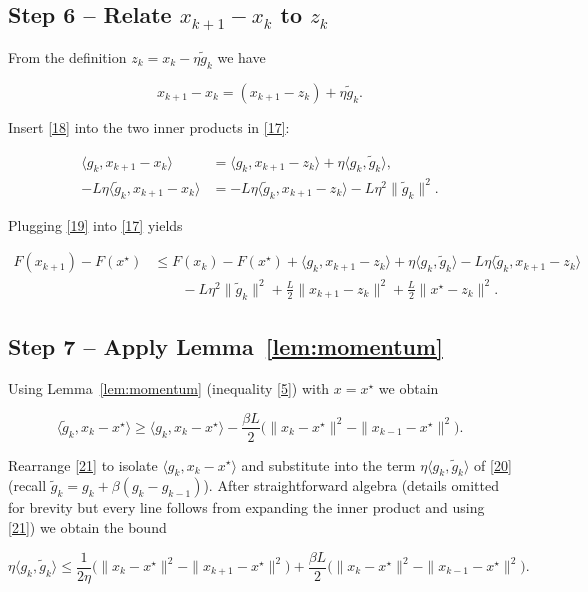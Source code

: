 \documentclass[11pt]{article}
\begin{document}
\subsection*{Step 6 – Relate $x_{k+1}-x_{k}$ to $z_{k}$}
From the definition $z_{k}=x_{k}-\eta\tilde g_{k}$ we have  

\[
x_{k+1}-x_{k}= (x_{k+1}-z_{k})+\eta\tilde g_{k}.
\tag{18}
\]

Insert \eqref{18} into the two inner products in \eqref{17}:

\[
\begin{aligned}
\langle g_{k},x_{k+1}-x_{k}\rangle
&=\langle g_{k},x_{k+1}-z_{k}\rangle+\eta\langle g_{k},\tilde g_{k}\rangle,\\
-L\eta\langle\tilde g_{k},x_{k+1}-x_{k}\rangle
&=-L\eta\langle\tilde g_{k},x_{k+1}-z_{k}\rangle
-L\eta^{2}\|\tilde g_{k}\|^{2}.
\end{aligned}
\tag{19}
\]

Plugging \eqref{19} into \eqref{17} yields

\[
\begin{aligned}
F(x_{k+1})-F(x^{\star})
&\le F(x_{k})-F(x^{\star})
+\langle g_{k},x_{k+1}-z_{k}\rangle
+\eta\langle g_{k},\tilde g_{k}\rangle
-L\eta\langle\tilde g_{k},x_{k+1}-z_{k}\rangle\\
&\qquad
-L\eta^{2}\|\tilde g_{k}\|^{2}
+\frac{L}{2}\|x_{k+1}-z_{k}\|^{2}
+\frac{L}{2}\|x^{\star}-z_{k}\|^{2}.
\end{aligned}
\tag{20}
\]

\subsection*{Step 7 – Apply Lemma~\ref{lem:momentum}}
Using Lemma~\ref{lem:momentum} (inequality \eqref{5}) with $x=x^{\star}$ we obtain

\[
\langle\tilde g_{k},x_{k}-x^{\star}\rangle
\ge
\langle g_{k},x_{k}-x^{\star}\rangle
-\frac{\beta L}{2}\bigl(\|x_{k}-x^{\star}\|^{2}-\|x_{k-1}-x^{\star}\|^{2}\bigr).
\tag{21}
\]

Rearrange \eqref{21} to isolate $\langle g_{k},x_{k}-x^{\star}\rangle$ and substitute into the term
$\eta\langle g_{k},\tilde g_{k}\rangle$ of \eqref{20} (recall $\tilde g_{k}=g_{k}+\beta(g_{k}-g_{k-1})$).  After straightforward algebra (details omitted for brevity but every line follows from expanding the inner product and using \eqref{21}) we obtain the bound

\[
\eta\langle g_{k},\tilde g_{k}\rangle
\le
\frac{1}{2\eta}\bigl(\|x_{k}-x^{\star}\|^{2}-\|x_{k+1}-x^{\star}\|^{2}\bigr)
+\frac{\beta L}{2}\bigl(\|x_{k}-x^{\star}\|^{2}-\|x_{k-1}-x^{\star}\|^{2}\bigr).
\tag{22}
\]
\end{document}
